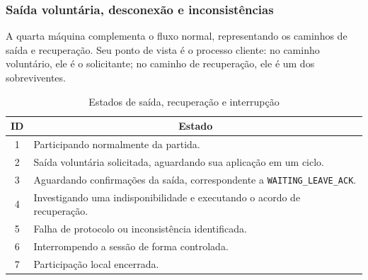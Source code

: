\documentclass[11pt,a4paper]{article}
\begin{document}
\subsubsection{Saída voluntária, desconexão e inconsistências}

A quarta máquina complementa o fluxo normal, representando os caminhos de saída e recuperação. Seu ponto de vista é o processo cliente: no caminho voluntário, ele é o solicitante; no caminho de recuperação, ele é um dos sobreviventes.

\begin{table}[H]
    \centering
    \caption{Estados de saída, recuperação e interrupção}
    \label{tab:fsm_falhas_estados}
    \begin{tabular}{|c|p{11.7cm}|}
        \hline
        \textbf{ID} & \multicolumn{1}{c|}{\textbf{Estado}} \\ \hline
        1 & Participando normalmente da partida. \\ \hline
        2 & Saída voluntária solicitada, aguardando sua aplicação em um ciclo. \\ \hline
        3 & Aguardando confirmações da saída, correspondente a \texttt{WAITING\_LEAVE\_ACK}. \\ \hline
        4 & Investigando uma indisponibilidade e executando o acordo de recuperação. \\ \hline
        5 & Falha de protocolo ou inconsistência identificada. \\ \hline
        6 & Interrompendo a sessão de forma controlada. \\ \hline
        7 & Participação local encerrada. \\ \hline
    \end{tabular}
\end{table}
\end{document}
